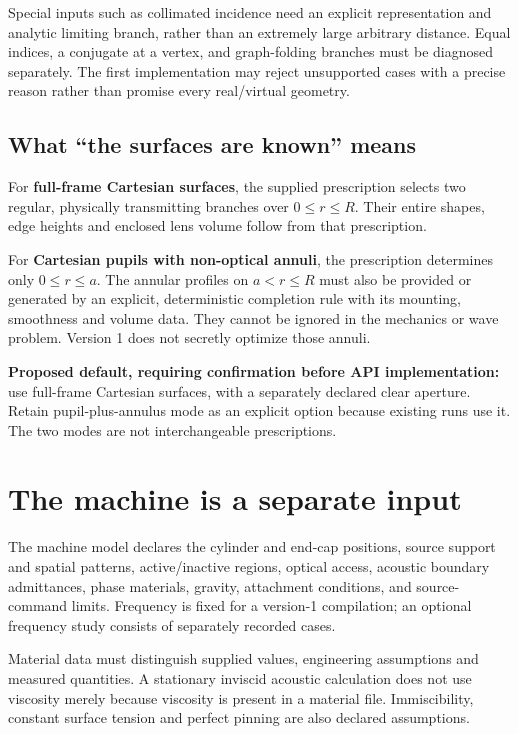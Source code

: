 Special inputs such as collimated incidence need an explicit
representation and analytic limiting branch, rather than an extremely
large arbitrary distance. Equal indices, a conjugate at a vertex, and
graph-folding branches must be diagnosed separately. The first
implementation may reject unsupported cases with a precise reason rather
than promise every real/virtual geometry.

\subsection{What ``the surfaces are known'' means}\label{what-the-surfaces-are-known-means}

For \textbf{full-frame Cartesian surfaces}, the supplied prescription
selects two regular, physically transmitting branches over $0\le r\le R$.
Their entire shapes, edge heights and enclosed lens volume follow from
that prescription.

For \textbf{Cartesian pupils with non-optical annuli}, the prescription
determines only $0\le r\le a$. The annular profiles on $a<r\le R$
must also be provided or generated by an explicit, deterministic
completion rule with its mounting, smoothness and volume data. They
cannot be ignored in the mechanics or wave problem. Version 1 does not
secretly optimize those annuli.

\textbf{Proposed default, requiring confirmation before API
implementation:} use full-frame Cartesian surfaces, with a separately
declared clear aperture. Retain pupil-plus-annulus mode as an explicit
option because existing runs use it. The two modes are not
interchangeable prescriptions.

\section{The machine is a separate input}\label{the-machine-is-a-separate-input}

The machine model declares the cylinder and end-cap positions, source
support and spatial patterns, active/inactive regions, optical access,
acoustic boundary admittances, phase materials, gravity, attachment
conditions, and source-command limits. Frequency is fixed for a
version-1 compilation; an optional frequency study consists of
separately recorded cases.

Material data must distinguish supplied values, engineering assumptions
and measured quantities. A stationary inviscid acoustic calculation does
not use viscosity merely because viscosity is present in a material
file. Immiscibility, constant surface tension and perfect pinning are
also declared assumptions.

